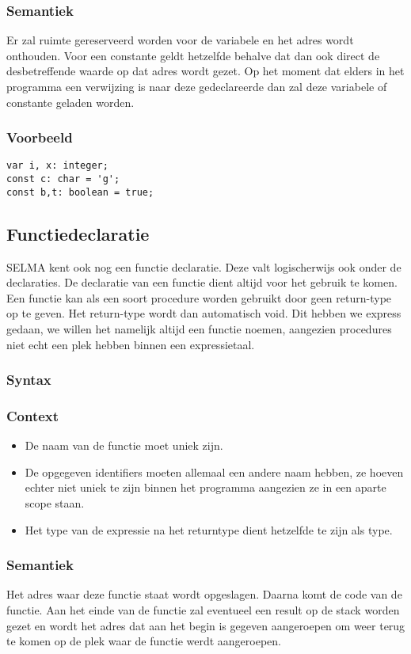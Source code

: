 \documentclass[]{article}
\begin{document}
\subsubsection{Semantiek}
Er zal ruimte gereserveerd worden voor de variabele en het adres wordt onthouden. Voor een constante geldt hetzelfde behalve dat dan ook direct de desbetreffende waarde op dat adres wordt gezet. Op het moment dat elders in het programma een verwijzing is naar deze gedeclareerde dan zal deze variabele of constante geladen worden.
\subsubsection{Voorbeeld}
\begin{lstlisting}[style=SELMA]
var i, x: integer;
const c: char = 'g';
const b,t: boolean = true;
\end{lstlisting}

\subsection{Functiedeclaratie}
SELMA kent ook nog een functie declaratie. Deze valt logischerwijs ook onder de declaraties. De declaratie van een functie dient altijd voor het gebruik te komen. Een functie kan als een soort procedure worden gebruikt door geen return-type op te geven. Het return-type wordt dan automatisch void. Dit hebben we express gedaan, we willen het namelijk altijd een functie noemen, aangezien procedures niet echt een plek hebben binnen een expressietaal.
\subsubsection{Syntax}

\subsubsection{Context}
\begin{itemize}
\item De naam van de functie moet uniek zijn.
\item De opgegeven identifiers moeten allemaal een andere naam hebben, ze hoeven echter niet uniek te zijn binnen het programma aangezien ze in een aparte scope staan.
\item Het type van de expressie na het returntype dient hetzelfde te zijn als type.
\end{itemize}
\subsubsection{Semantiek}
Het adres waar deze functie staat wordt opgeslagen. Daarna komt de code van de functie. Aan het einde van de functie zal eventueel een result op de stack worden gezet en wordt het adres dat aan het begin is gegeven aangeroepen om weer terug te komen op de plek waar de functie werdt aangeroepen.
\end{document}
